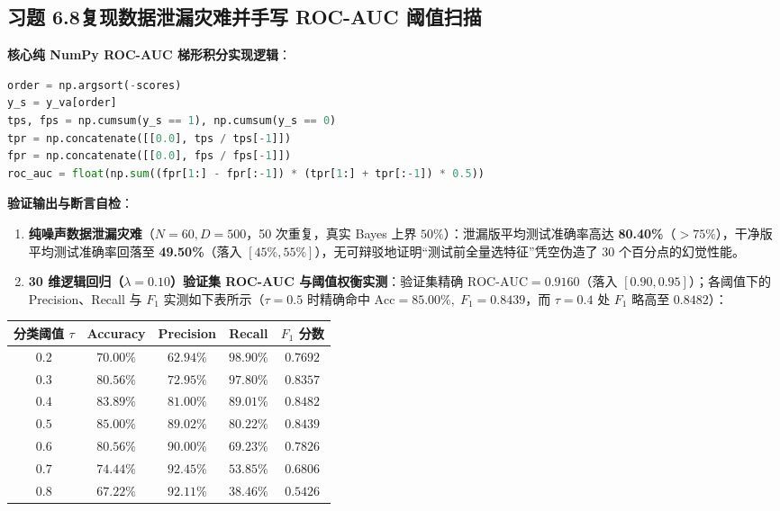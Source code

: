 \subsection*{习题 6.8\quad 复现数据泄漏灾难并手写 ROC-AUC 阈值扫描}
\textbf{核心纯 NumPy ROC-AUC 梯形积分实现逻辑}：
\begin{lstlisting}[language=Python]
order = np.argsort(-scores)
y_s = y_va[order]
tps, fps = np.cumsum(y_s == 1), np.cumsum(y_s == 0)
tpr = np.concatenate([[0.0], tps / tps[-1]])
fpr = np.concatenate([[0.0], fps / fps[-1]])
roc_auc = float(np.sum((fpr[1:] - fpr[:-1]) * (tpr[1:] + tpr[:-1]) * 0.5))
\end{lstlisting}
\textbf{验证输出与断言自检}：
\begin{enumerate}[label=(\alph*), leftmargin=1.8em]
  \item \textbf{纯噪声数据泄漏灾难}（$N=60, D=500$，50 次重复，真实 Bayes 上界 $50\%$）：泄漏版平均测试准确率高达 \textbf{80.40\%}（$>75\%$），干净版平均测试准确率回落至 \textbf{49.50\%}（落入 $[45\%, 55\%]$），无可辩驳地证明“测试前全量选特征”凭空伪造了 30 个百分点的幻觉性能。
\par\pagebreak[4]
  \item \textbf{30 维逻辑回归（$\lambda = 0.10$）验证集 ROC-AUC 与阈值权衡实测}：验证集精确 $\mathrm{ROC\text{-}AUC} = \mathbf{0.9160}$（落入 $[0.90, 0.95]$）；各阈值下的 Precision、Recall 与 $F_1$ 实测如下表所示（$\tau=0.5$ 时精确命中 $\mathrm{Acc}=85.00\%,\; F_1=0.8439$，而 $\tau=0.4$ 处 $F_1$ 略高至 $0.8482$）：
\end{enumerate}

\begin{center}
\small
\begin{tabular}{@{}ccccc@{}}
\toprule
分类阈值 $\tau$ & Accuracy & Precision & Recall & $F_1$ 分数 \\
\midrule
$0.2$ & $70.00\%$ & $62.94\%$ & $98.90\%$ & $0.7692$ \\
$0.3$ & $80.56\%$ & $72.95\%$ & $97.80\%$ & $0.8357$ \\
$0.4$ & $83.89\%$ & $81.00\%$ & $89.01\%$ & $\mathbf{0.8482}$ \\
$0.5$ & $\mathbf{85.00\%}$ & $89.02\%$ & $80.22\%$ & $0.8439$ \\
$0.6$ & $80.56\%$ & $90.00\%$ & $69.23\%$ & $0.7826$ \\
$0.7$ & $74.44\%$ & $\mathbf{92.45\%}$ & $53.85\%$ & $0.6806$ \\
$0.8$ & $67.22\%$ & $92.11\%$ & $38.46\%$ & $0.5426$ \\
\bottomrule
\end{tabular}
\end{center}
